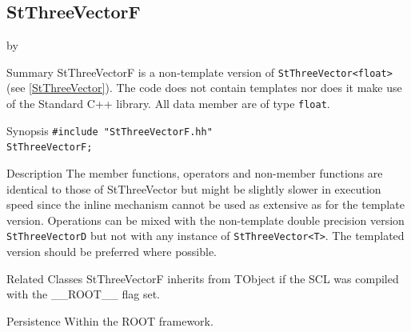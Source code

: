 \documentclass[twoside]{article}
\newcommand{\name}[1]{\textsf{#1}}%
\newcommand{\entrylabel}[1]{\mbox{\textbf{{#1}}}\hfil}%
\newenvironment{entry}
{\begin{list}{}%
    {\renewcommand{\makelabel}{\entrylabel}%
     \setlength{\labelwidth}{90pt}%
     \setlength{\leftmargin}{\labelwidth}
     \advance\leftmargin by \labelsep%
      }%
    }%
  {\end{list}}
\newcommand{\Entrylabel}[1]%
{\raisebox{0pt}[1ex][0pt]{\makebox[\labelwidth][l]%
    {\parbox[t]{\labelwidth}{\hspace{0pt}\textbf{{#1}}}}}}
\newenvironment{Entry}%
{\renewcommand{\entrylabel}{\Entrylabel}\begin{entry}}%
  {\end{entry}}
\begin{document}
\subsection{StThreeVectorF }
\begin{Entry}
\item[Summary]
    StThreeVectorF is a non-template version of \verb+StThreeVector<float>+
    (see \ref{StThreeVector}). The code does not contain templates nor
    does it make use of the Standard C++ library. All data member are of
    type \texttt{float}.
    
\item[Synopsis]
    \verb+#include "StThreeVectorF.hh"+ \\
    \verb+StThreeVectorF;+
    
\item[Description]       
    The member functions, operators and non-member functions are identical
    to those of StThreeVector but might be slightly slower in execution speed
    since the inline mechanism cannot be used as extensive as for the template
    version. Operations can be mixed with the non-template double precision version
    \texttt{StThreeVectorD} but not with any instance of \verb+StThreeVector<T>+.
    The templated version should be preferred where possible.

\item[Related Classes]
    StThreeVectorF inherits from TObject 
    if the SCL was compiled with the \name{\_\_ROOT\_\_} flag set.

\item[Persistence]
    Within the ROOT framework.

\end{Entry}

\clearpage

%
%
\end{document}
